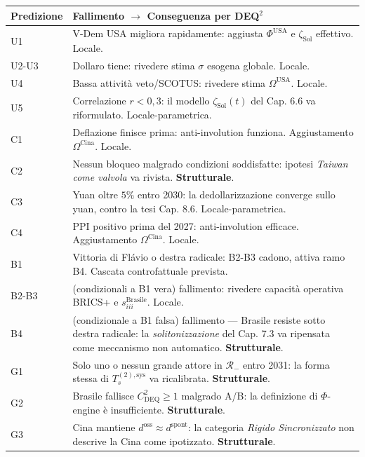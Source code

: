 {\def\LTcaptype{none} %
{\small\begin{longtable}[]{@{}
  >{\raggedright\arraybackslash}p{}
  >{\raggedright\arraybackslash}p{}@{}}
\toprule\noalign{}
\begin{minipage}[b]{\linewidth}\raggedright
Predizione
\end{minipage} & \begin{minipage}[b]{\linewidth}\raggedright
Fallimento $\to$ Conseguenza per DEQ$^2$
\end{minipage} \\
\midrule\noalign{}
\endhead
\bottomrule\noalign{}
\endlastfoot
U1 & V-Dem USA migliora rapidamente: aggiusta \(\Phi^{\text{USA}}\) e
\(\zeta_{\text{Sol}}\) effettivo. Locale. \\
U2-U3 & Dollaro tiene: rivedere stima \(\sigma\) esogena globale.
Locale. \\
U4 & Bassa attività veto/SCOTUS: rivedere stima \(\Omega^{\text{USA}}\).
Locale. \\
U5 & Correlazione \(r < 0{,}3\): il modello \(\zeta_{\text{Sol}}(t)\)
del Cap. 6.6 va riformulato. Locale-parametrica. \\
C1 & Deflazione finisce prima: anti-involution funziona. Aggiustamento
\(\Omega^{\text{Cina}}\). Locale. \\
C2 & Nessun bloqueo malgrado condizioni soddisfatte: ipotesi
\emph{Taiwan come valvola} va rivista. \textbf{Strutturale}. \\
C3 & Yuan oltre \(5\%\) entro 2030: la dedollarizzazione converge sullo
yuan, contro la tesi Cap. 8.6. Locale-parametrica. \\
C4 & PPI positivo prima del 2027: anti-involution efficace.
Aggiustamento \(\Omega^{\text{Cina}}\). Locale. \\
B1 & Vittoria di Flávio o destra radicale: B2-B3 cadono, attiva ramo B4.
Cascata controfattuale prevista. \\
B2-B3 & (condizionali a B1 vera) fallimento: rivedere capacità operativa
BRICS+ e \(s_{iii}^{\text{Brasile}}\). Locale. \\
B4 & (condizionale a B1 falsa) fallimento --- Brasile resiste sotto
destra radicale: la \emph{solitonizzazione} del Cap. 7.3 va ripensata
come meccanismo non automatico. \textbf{Strutturale}. \\
G1 & Solo uno o nessun grande attore in \(\mathcal{R}_-\) entro 2031: la
forma stessa di \(T_s^{(2),\text{sys}}\) va ricalibrata.
\textbf{Strutturale}. \\
G2 & Brasile fallisce \(C_{\text{DEQ}}^2 \geq 1\) malgrado A/B: la
definizione di \(\Phi\)-engine è insufficiente. \textbf{Strutturale}. \\
G3 & Cina mantiene \(d^{\text{oss}} \approx d^{\text{spont}}\): la
categoria \emph{Rigido Sincronizzato} non descrive la Cina come
ipotizzato. \textbf{Strutturale}. \\
\end{longtable}}
}

